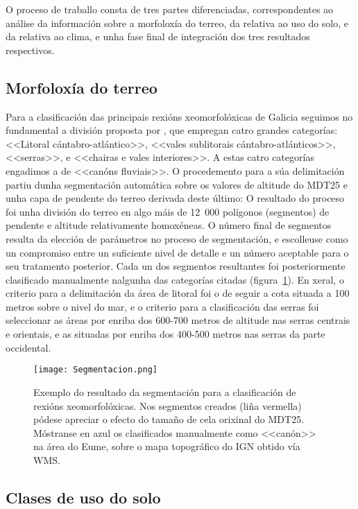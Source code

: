 \documentclass[11pt,a4paper]{article}
\begin{document}
O proceso de traballo consta de tres partes diferenciadas, correspondentes ao análise da información sobre a morfoloxía do terreo, da relativa ao uso do solo, e da relativa ao clima, e unha fase final de integración dos tres resultados respectivos.

\subsection{Morfoloxía do terreo}

Para a clasificación das principais rexións xeomorfolóxicas de Galicia seguimos no fundamental a división proposta por \citet{Ramil2005}, que empregan catro grandes categorías: <<Litoral cántabro-atlántico>>, <<vales sublitorais cántabro-atlánticos>>, <<serras>>, e <<chairas e vales interiores>>. A estas catro categorías engadimos a de <<canóns fluviais>>.
O procedemento para a súa delimitación partiu dunha segmentación automática sobre os valores de altitude do MDT25 e unha capa de pendente do terreo derivada deste último: O resultado do proceso foi unha división do terreo en algo máis de 12~000 polígonos (segmentos) de pendente e altitude relativamente homoxéneas. O número final de segmentos resulta da elección de parámetros no proceso de segmentación, e escolleuse como un compromiso entre un suficiente nivel de detalle e un número aceptable para o seu tratamento posterior. Cada un dos segmentos resultantes foi posteriormente clasificado manualmente nalgunha das categorías citadas (figura~\ref{fig:Morfo}). En xeral, o criterio para a delimitación da área de litoral foi o de seguir a cota situada a 100 metros sobre o nivel do mar, e o criterio para a clasificación das serras foi seleccionar as áreas por enriba dos 600-700 metros de altitude \citep{PerezAlberti1986} nas serras centrais e orientais, e as situadas por enriba dos 400-500 metros nas serras da parte occidental.


\begin{figure}
\caption{Exemplo do resultado da segmentación para a clasificación de rexións xeomorfolóxicas. Nos segmentos creados (liña vermella) pódese apreciar o efecto do tamaño de cela orixinal do MDT25. Móstranse en azul os clasificados manualmente como <<canón>> na área do Eume, sobre o mapa topográfico do IGN obtido vía WMS.}\label{fig:Morfo}
\texttt{[image: Segmentacion.png]}
\end{figure}

\subsection{Clases de uso do solo}
\end{document}
